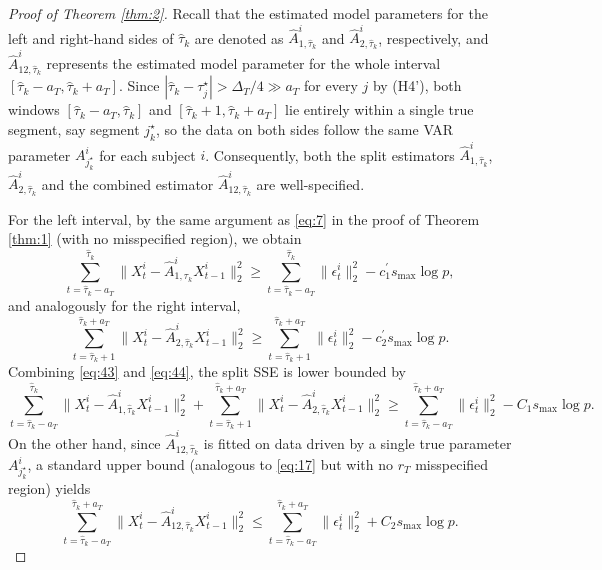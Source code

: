 \documentclass[11pt]{article}
\begin{document}
\begin{proof}[Proof of Theorem \ref{thm:2}]
Recall that the estimated model parameters for the left and right-hand sides of $\widehat{\tau}_k$ are denoted as $\widehat{A}_{1,\widehat{\tau}_k}^i$ and $\widehat{A}_{2,\widehat{\tau}_k}^i$, respectively, and $\widehat{A}_{12,\widehat{\tau}_k}^i$ represents the estimated model parameter for the whole interval $[\widehat{\tau}_k-a_T, \widehat{\tau}_k+a_T]$. Since $|\widehat{\tau}_k - \tau_j^\star| > \Delta_T/4 \gg a_T$ for every $j$ by (H4'), both windows $[\widehat{\tau}_k - a_T,\widehat{\tau}_k]$ and $[\widehat{\tau}_k + 1, \widehat{\tau}_k + a_T]$ lie entirely within a single true segment, say segment $j^\star_k$, so the data on both sides follow the same VAR parameter $A^i_{j^\star_k}$ for each subject $i$. Consequently, both the split estimators $\widehat{A}_{1,\widehat{\tau}_k}^i$, $\widehat{A}_{2,\widehat{\tau}_k}^i$ and the combined estimator $\widehat{A}_{12,\widehat{\tau}_k}^i$ are well-specified.

For the left interval, by the same argument as \eqref{eq:7} in the proof of Theorem \ref{thm:1} (with no misspecified region), we obtain
\begin{equation}
    \label{eq:43}
    \sum_{t=\widehat{\tau}_k-a_T}^{\widehat{\tau}_k}\|X_t^i - \widehat{A}_{1,\widehat{\tau}_k}^iX_{t-1}^i\|_2^2 \geq \sum_{t=\widehat{\tau}_k-a_T}^{\widehat{\tau}_k}\|\epsilon_t^i\|_2^2 - c_1^\prime s_{\max}\log p,
\end{equation}
and analogously for the right interval,
\begin{equation}
    \label{eq:44}
    \sum_{t=\widehat{\tau}_k+1}^{\widehat{\tau}_k+a_T}\|X_t^i - \widehat{A}^i_{2,\widehat{\tau}_k}X_{t-1}^i\|_2^2 \geq \sum_{t=\widehat{\tau}_k+1}^{\widehat{\tau}_k+a_T}\|\epsilon_t^i\|_2^2 - c_2^\prime s_{\max}\log p.
\end{equation}
Combining \eqref{eq:43} and \eqref{eq:44}, the split SSE is lower bounded by
\begin{equation}
    \label{eq:45}
    \sum_{t=\widehat{\tau}_k-a_T}^{\widehat{\tau}_k}\|X_t^i - \widehat{A}_{1,\widehat{\tau}_k}^iX_{t-1}^i\|_2^2 + \sum_{t=\widehat{\tau}_k+1}^{\widehat{\tau}_k+a_T}\|X_t^i - \widehat{A}^i_{2,\widehat{\tau}_k}X_{t-1}^i\|_2^2 \geq \sum_{t=\widehat{\tau}_k-a_T}^{\widehat{\tau}_k+a_T}\|\epsilon_t^i\|_2^2 - C_1 s_{\max}\log p.
\end{equation}
On the other hand, since $\widehat{A}^i_{12,\widehat{\tau}_k}$ is fitted on data driven by a single true parameter $A^i_{j^\star_k}$, a standard upper bound (analogous to \eqref{eq:17} but with no $r_T$ misspecified region) yields
\begin{equation}
    \label{eq:46}
    \sum_{t=\widehat{\tau}_k-a_T}^{\widehat{\tau}_k+a_T}\|X_t^i - \widehat{A}_{12,\widehat{\tau}_k}^iX_{t-1}^i\|_2^2 \leq \sum_{t=\widehat{\tau}_k-a_T}^{\widehat{\tau}_k+a_T}\|\epsilon_t^i\|_2^2 + C_2 s_{\max}\log p.
\end{equation}


\end{proof}
\end{document}
